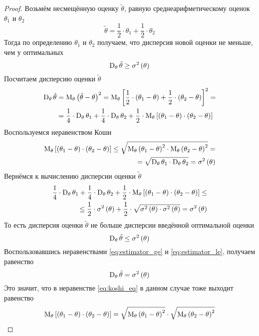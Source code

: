 \begin{proof}
  Возьмём несмещённую оценку $\tilde{\theta}$,
  равную среднеарифметическому оценок $\theta_1$ и $\theta_2$
  $$\tilde{\theta} = \frac{1}{2}\cdot \theta_1 + \frac{1}{2} \cdot \theta_2$$
  Тогда по определению $\theta_1$ и $\theta_2$ получаем,
  что дисперсия новой оценки не меньше, чем у оптимальных
  \begin{equation}\label{eq:estimator_ge}
    \operatorname{D}_{\theta} \tilde{\theta}\ge\sigma^2\left(\theta\right)
  \end{equation}
  Посчитаем дисперсию оценки $\tilde{\theta}$
  \begin{align*}
  \operatorname{D}_{\theta} \tilde{\theta}
    &= \operatorname{M}_{\theta} \left( \tilde{\theta}-\theta \right)^2
    = \operatorname{M}_{\theta} \left[ \frac{1}{2}\cdot \left( \theta_1-\theta \right)
      + \frac{1}{2}\cdot \left( \theta_2-\theta \right) \right]^2= \\
    &= \frac{1}{4}\cdot \operatorname{D}_{\theta} \theta_1
      + \frac{1}{4}\cdot \operatorname{D}_{\theta} \theta_2
      + \frac{1}{2}\cdot \operatorname{M}_{\theta} \left[ \left( \theta_1-\theta \right)
          \cdot \left( \theta_2-\theta \right) \right]
  \end{align*}
  Воспользуемся неравенством Коши%
  \begin{eqnarray}\label{eq:koshi_eq}
    \operatorname{M}_{\theta} \left[ \left( \theta_1-\theta \right)
      \cdot \left( \theta_2-\theta \right) \right]
    \le\sqrt{\operatorname{M}_{\theta} \left( \theta_1-\theta \right)^2
      \cdot \operatorname{M}_{\theta} \left( \theta_2-\theta \right)^2}= \\
    = \sqrt{\operatorname{D}_{\theta} \theta_1
      \cdot \operatorname{D}_{\theta} \theta_2}
    = \sigma^2\left( \theta \right)
    \nonumber
  \end{eqnarray}
  Вернёмся к вычислению дисперсии оценки $\tilde{\theta}$
  \begin{align*}
    \frac{1}{4}\cdot \operatorname{D}_{\theta} \theta_1
      + \frac{1}{4}\cdot \operatorname{D}_{\theta} \theta_2
      + \frac{1}{2}\cdot \operatorname{M}_{\theta} \left[ \left( \theta_1-\theta \right)
          \cdot \left( \theta_2-\theta \right) \right]\le\\
    \le\frac{1}{2}\cdot \sigma^2\left( \theta \right)
      + \frac{1}{2}\cdot \sqrt{\sigma^2\left( \theta \right)
        \cdot \sigma^2\left( \theta \right)}
    = \sigma^2\left( \theta \right)
  \end{align*}
  То есть дисперсия оценки $\tilde{\theta}$ не больше дисперсии
  введённой оптимальной оценки
  \begin{equation}\label{eq:estimator_le}
    \operatorname{D}_{\theta} \tilde{\theta}\le\sigma^2\left(\theta\right)
  \end{equation}
  Воспользовавшись неравенствами
  \eqref{eq:estimator_ge} и \eqref{eq:estimator_le}, получаем равенство
  $$\operatorname{D}_{\theta} \tilde{\theta}= \sigma^2\left(\theta\right)$$
  Это значит, что в неравенстве \eqref{eq:koshi_eq}
  в данном случае тоже выходит равенство
  $$\operatorname{M}_{\theta} \left[ \left( \theta_1-\theta \right)
      \cdot \left( \theta_2-\theta \right) \right]
    = \sqrt{\operatorname{M}_{\theta} \left( \theta_1-\theta \right)^2}
      \cdot \sqrt{\operatorname{M}_{\theta} \left( \theta_2-\theta \right)^2}$$


\end{proof}
